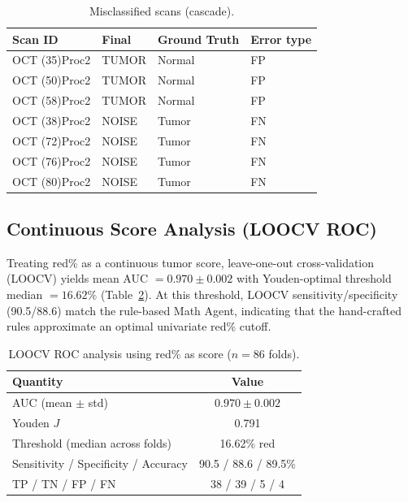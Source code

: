 \documentclass[11pt]{article}
\begin{document}
\begin{table}[ht]
  \centering
  \caption{Misclassified scans (cascade).}
  \label{tab:errors}
  \small
  \begin{tabular}{llll}
    \toprule
    Scan ID & Final & Ground Truth & Error type \\
    \midrule
    OCT (35)Proc2 & TUMOR & Normal & FP \\
    OCT (50)Proc2 & TUMOR & Normal & FP \\
    OCT (58)Proc2 & TUMOR & Normal & FP \\
    OCT (38)Proc2 & NOISE & Tumor  & FN \\
    OCT (72)Proc2 & NOISE & Tumor  & FN \\
    OCT (76)Proc2 & NOISE & Tumor  & FN \\
    OCT (80)Proc2 & NOISE & Tumor  & FN \\
    \bottomrule
  \end{tabular}
\end{table}

\subsection{Continuous Score Analysis (LOOCV ROC)}

Treating red\% as a continuous tumor score, leave-one-out cross-validation (LOOCV) yields mean AUC $= 0.970 \pm 0.002$ with Youden-optimal threshold median $= 16.62\%$ (Table~\ref{tab:loocv}).
At this threshold, LOOCV sensitivity/specificity (90.5/88.6) match the rule-based Math Agent, indicating that the hand-crafted rules approximate an optimal univariate red\% cutoff.

\begin{table}[ht]
  \centering
  \caption{LOOCV ROC analysis using red\% as score ($n=86$ folds).}
  \label{tab:loocv}
  \begin{tabular}{lc}
    \toprule
    Quantity & Value \\
    \midrule
    AUC (mean $\pm$ std) & $0.970 \pm 0.002$ \\
    Youden $J$ & 0.791 \\
    Threshold (median across folds) & 16.62\% red \\
    Sensitivity / Specificity / Accuracy & 90.5 / 88.6 / 89.5\% \\
    TP / TN / FP / FN & 38 / 39 / 5 / 4 \\
    \bottomrule
  \end{tabular}
\end{table}
\end{document}
